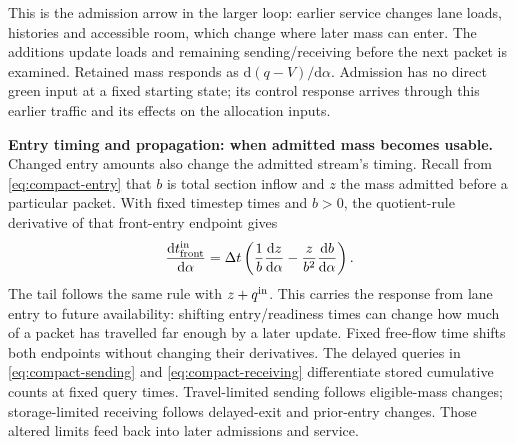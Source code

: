 \documentclass[10pt,a4paper]{article}
\begin{document}
This is the admission arrow in the larger loop: earlier service changes
lane loads, histories and accessible room, which change where later mass
can enter. The additions update loads and remaining sending/receiving
before the next packet is examined. Retained mass responds as
$\mathrm d(q-V)/\mathrm d\alpha$. Admission has no direct green input
at a fixed starting state; its control response arrives through this
earlier traffic and its effects on the allocation inputs.

\textbf{Entry timing and propagation: when admitted mass becomes usable.}
Changed entry amounts also change the admitted stream's timing.
Recall from \eqref{eq:compact-entry} that $b$ is total section inflow
and $z$ the mass admitted before a particular packet. With fixed timestep
times and $b>0$,
the quotient-rule derivative of that front-entry endpoint gives
\begin{equation}
 \frac{\mathrm dt^{\rm in}_{\rm front}}{\mathrm d\alpha}
 =\Delta t\left(\frac1b\frac{\mathrm dz}{\mathrm d\alpha}
       -\frac z{b^2}\frac{\mathrm db}{\mathrm d\alpha}\right).
 \label{eq:compact-entry-derivative}
\end{equation}
The tail follows the same rule with $z+q^{\rm in}$.
This carries the response from lane entry to future availability:
shifting entry/readiness times can change how much of a packet has
travelled far enough by a later update. Fixed free-flow time shifts both
endpoints without changing their derivatives.
The delayed queries in \eqref{eq:compact-sending} and
\eqref{eq:compact-receiving} differentiate stored cumulative counts at
fixed query times. Travel-limited sending follows eligible-mass changes;
storage-limited receiving follows delayed-exit and prior-entry changes.
Those altered limits feed back into later admissions and service.
\end{document}
